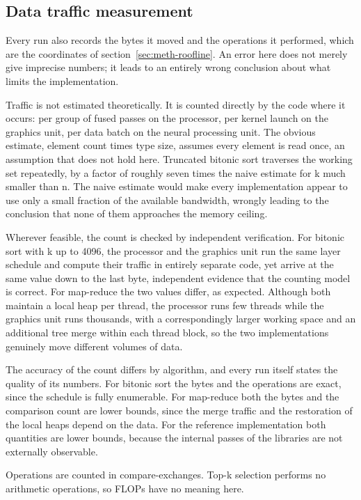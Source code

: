 \subsection{Data traffic measurement}
\label{sec:meth-traffic}

Every run also records the bytes it moved and the operations it performed,
which are the coordinates of section~\ref{sec:meth-roofline}. An error here
does not merely give imprecise numbers; it leads to an entirely wrong
conclusion about what limits the implementation.

Traffic is not estimated theoretically. It is counted directly by the code
where it occurs: per group of fused passes on the processor, per kernel launch
on the graphics unit, per data batch on the neural processing unit. The obvious
estimate, element count times type size, assumes every element is read once, an
assumption that does not hold here. Truncated bitonic sort traverses the
working set repeatedly, by a factor of roughly seven times the naive estimate
for k much smaller than n. The naive estimate would make every implementation
appear to use only a small fraction of the available bandwidth, wrongly leading
to the conclusion that none of them approaches the memory ceiling.

Wherever feasible, the count is checked by independent verification. For
bitonic sort with k up to 4096, the processor and the graphics unit run the
same layer schedule and compute their traffic in entirely separate code, yet
arrive at the same value down to the last byte, independent evidence that the
counting model is correct. For map-reduce the two values differ, as expected.
Although both maintain a local heap per thread, the processor runs few threads
while the graphics unit runs thousands, with a correspondingly larger working
space and an additional tree merge within each thread block, so the two
implementations genuinely move different volumes of data.

The accuracy of the count differs by algorithm, and every run itself states the
quality of its numbers. For bitonic sort the bytes and the operations are
exact, since the schedule is fully enumerable. For map-reduce both the bytes
and the comparison count are lower bounds, since the merge traffic and the
restoration of the local heaps depend on the data. For the reference
implementation both quantities are lower bounds, because the internal passes of
the libraries are not externally observable.

Operations are counted in compare-exchanges. Top-k selection performs no
arithmetic operations, so FLOPs have no meaning here.

